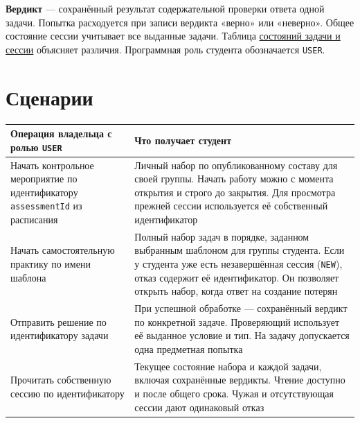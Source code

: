 \documentclass[12pt,a4paper]{article}
\begin{document}
\textbf{Вердикт} --- сохранённый результат содержательной проверки ответа одной задачи. Попытка расходуется при записи вердикта «верно» или «неверно». Общее состояние сессии учитывает все выданные задачи. Таблица {\href{../methodology/Глоссарий.pdf\#ответ-попытка-и-состояние}{состояний задачи и сессии}} объясняет различия. Программная роль студента обозначается \texttt{USER}.

\section{Сценарии}\label{ux441ux446ux435ux43dux430ux440ux438ux438}

\hypertarget{сценарии}{}

{\def\LTcaptype{none} %
\begin{longtable}[]{@{}
  >{\raggedright\arraybackslash}p{}
  >{\raggedright\arraybackslash}p{}@{}}
\toprule\noalign{}
\begin{minipage}[b]{\linewidth}\raggedright
Операция владельца с ролью \texttt{USER}
\end{minipage} & \begin{minipage}[b]{\linewidth}\raggedright
Что получает студент
\end{minipage} \\
\midrule\noalign{}
\endhead
\bottomrule\noalign{}
\endlastfoot
Начать контрольное мероприятие по идентификатору \texttt{assessmentId} из расписания & Личный набор по опубликованному составу для своей группы. Начать работу можно с момента открытия и строго до закрытия. Для просмотра прежней сессии используется её собственный идентификатор \\
Начать самостоятельную практику по имени шаблона & Полный набор задач в порядке, заданном выбранным шаблоном для группы студента. Если у студента уже есть незавершённая сессия (\texttt{NEW}), отказ содержит её идентификатор. Он позволяет открыть набор, когда ответ на создание потерян \\
Отправить решение по идентификатору задачи & При успешной обработке --- сохранённый вердикт по конкретной задаче. Проверяющий использует её выданное условие и тип. На задачу допускается одна предметная попытка \\
Прочитать собственную сессию по идентификатору & Текущее состояние набора и каждой задачи, включая сохранённые вердикты. Чтение доступно и после общего срока. Чужая и отсутствующая сессии дают одинаковый отказ \\
\end{longtable}
}
\end{document}
